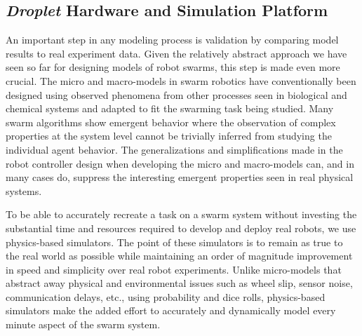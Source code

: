 \documentclass[11pt, onecolumn, compsoc, letterpaper]{article}
\begin{document}
\subsection{\emph{Droplet} Hardware and Simulation Platform}
An important step in any modeling process is validation by comparing model results to real experiment data. Given the relatively abstract approach we have seen so far for designing models of robot swarms, this step is made even more crucial. The micro and macro-models in swarm robotics have conventionally been designed using observed phenomena from other processes seen in biological and chemical systems and adapted to fit the swarming task being studied. Many swarm algorithms show emergent behavior where the observation of complex properties at the system level cannot be trivially inferred from studying the individual agent behavior. The generalizations and simplifications made in the robot controller design when developing the micro and macro-models can, and in many cases do, suppress the interesting emergent properties seen in real physical systems. 

To be able to accurately recreate a task on a swarm system without investing the substantial time and resources required to develop and deploy real robots, we use physics-based simulators. The point of these simulators is to remain as true to the real world as possible while maintaining an order of magnitude improvement in speed and simplicity over real robot experiments. Unlike micro-models that abstract away physical and environmental issues such as wheel slip, sensor noise, communication delays, etc., using probability and dice rolls, physics-based simulators make the added effort to accurately and dynamically model every minute aspect of the swarm system.
\end{document}
